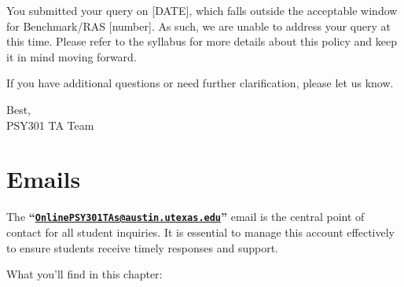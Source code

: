 \documentclass[
]{article}
\begin{document}
You submitted your query on {[}DATE{]}, which falls outside the acceptable window for Benchmark/RAS {[}number{]}. As such, we are unable to address your query at this time. Please refer to the syllabus for more details about this policy and keep it in mind moving forward.

If you have additional questions or need further clarification, please let us know.

Best,\\
PSY301 TA Team

\hypertarget{emails}{%
\section{Emails}\label{emails}}

The \textbf{``\href{mailto:OnlinePSY301TAs@austin.utexas.edu}{\nolinkurl{OnlinePSY301TAs@austin.utexas.edu}}''} email is the central point of contact for all student inquiries. It is essential to manage this account effectively to ensure students receive timely responses and support.

What you'll find in this chapter:
\end{document}
